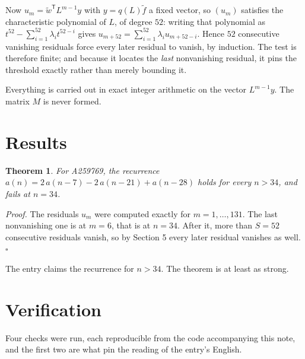 \documentclass[11pt]{article}
\newtheorem{theorem}{Theorem}
\theoremstyle{definition}
\begin{document}
Now $u_m = \tilde w^{\mathsf T} L^{m-1} y$ with $y = q(L)\tilde f$ a fixed vector, so $(u_m)$ satisfies the characteristic polynomial of $L$, of degree $52$: writing that polynomial as $t^{52} - \sum_{i=1}^{52} \lambda_i t^{52-i}$ gives $u_{m+52} = \sum_{i=1}^{52} \lambda_i u_{m+52-i}$. Hence $52$ consecutive vanishing residuals force every later residual to vanish, by induction. The test is therefore finite; and because it locates the {\itshape last} nonvanishing residual, it pins the threshold exactly rather than merely bounding it.

Everything is carried out in exact integer arithmetic on the vector $L^{m-1}y$. The matrix $M$ is never formed.

\section{Results}

\begin{theorem} For A259769, the recurrence $a(n) = 2\,a(n-7) - 2\,a(n-21) + a(n-28)$ holds for every $n > 34$, and fails at $n = 34$.\end{theorem}

{\itshape Proof.} The residuals $u_m$ were computed exactly for $m = 1,\dots,131$. The last nonvanishing one is at $m = 6$, that is at $n = 34$. After it, more than $S = 52$ consecutive residuals vanish, so by Section 5 every later residual vanishes as well. $\square$

The entry claims the recurrence for $n > 34$. The theorem is at least as strong.

\section{Verification}

Four checks were run, each reproducible from the code accompanying this note, and the first two are what pin the reading of the entry's English.
\end{document}
